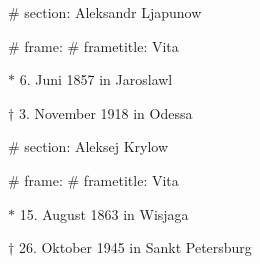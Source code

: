 
# section: Aleksandr Ljapunow

# frame:
  # frametitle: Vita

  $*$ 6. Juni 1857 in Jaroslawl

  $\dagger$ 3. November 1918 in Odessa




# section: Aleksej Krylow

# frame:
  # frametitle: Vita

  $*$ 15. August 1863 in Wisjaga

  $\dagger$ 26. Oktober 1945 in Sankt Petersburg
